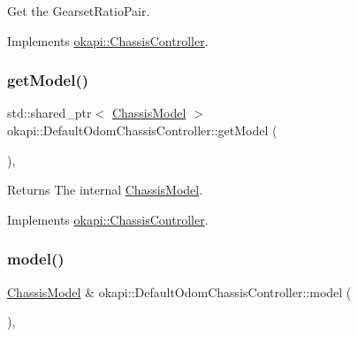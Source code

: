 Get the Gearset\+Ratio\+Pair. 

Implements \mbox{\hyperlink{classokapi_1_1ChassisController_aa19351888b997d4a6596dac24520ebff}{okapi\+::\+Chassis\+Controller}}.

\mbox{\label{classokapi_1_1DefaultOdomChassisController_a83e8bf7115086c331ada990ceb872bf1}} 
\subsubsection{\texorpdfstring{getModel()}{getModel()}}
{\footnotesize\ttfamily std\+::shared\+\_\+ptr$<$ \mbox{\hyperlink{classokapi_1_1ChassisModel}{Chassis\+Model}} $>$ okapi\+::\+Default\+Odom\+Chassis\+Controller\+::get\+Model (\begin{DoxyParamCaption}{ }\end{DoxyParamCaption})\hspace{0.3cm}{\ttfamily [override]}, {\ttfamily [virtual]}}

\begin{DoxyReturn}{Returns}
The internal \mbox{\hyperlink{classokapi_1_1ChassisModel}{Chassis\+Model}}. 
\end{DoxyReturn}


Implements \mbox{\hyperlink{classokapi_1_1ChassisController_a1971d4b54b61718437824c026aca53c9}{okapi\+::\+Chassis\+Controller}}.

\mbox{\label{classokapi_1_1DefaultOdomChassisController_aa917086153b6298bf7792fd3b31ac240}} 
\subsubsection{\texorpdfstring{model()}{model()}}
{\footnotesize\ttfamily \mbox{\hyperlink{classokapi_1_1ChassisModel}{Chassis\+Model}} \& okapi\+::\+Default\+Odom\+Chassis\+Controller\+::model (\begin{DoxyParamCaption}{ }\end{DoxyParamCaption})\hspace{0.3cm}{\ttfamily [override]}, {\ttfamily [virtual]}}

